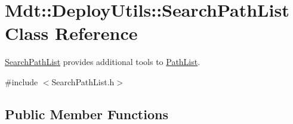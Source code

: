 \hypertarget{class_mdt_1_1_deploy_utils_1_1_search_path_list}{}\section{Mdt\+:\+:Deploy\+Utils\+:\+:Search\+Path\+List Class Reference}
\label{class_mdt_1_1_deploy_utils_1_1_search_path_list}


\hyperlink{class_mdt_1_1_deploy_utils_1_1_search_path_list}{Search\+Path\+List} provides additional tools to \hyperlink{class_mdt_1_1_deploy_utils_1_1_path_list}{Path\+List}.  




{\ttfamily \#include $<$Search\+Path\+List.\+h$>$}

\subsection*{Public Member Functions}

